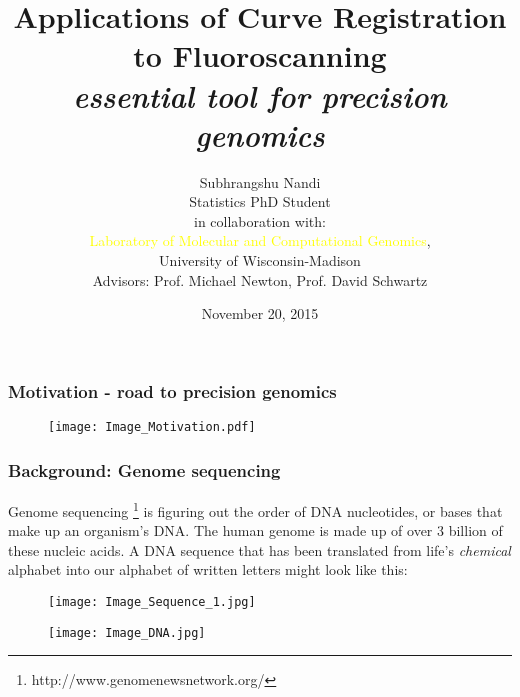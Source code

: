 \documentclass[10pt,dvipsnames,table, notes]{beamer}
\title[Curve Registration in Fluoroscanning]{Applications of Curve Registration to Fluoroscanning\\ {\emph{essential tool for precision genomics}}}
\author[S. Nandi]{Subhrangshu Nandi \\
Statistics PhD Student \\
\vspace{0.5cm}
\small{in collaboration with:} \\
\textcolor{yellow}{Laboratory of Molecular and Computational Genomics}, \\
University of Wisconsin-Madison \\
Advisors: Prof. Michael Newton, Prof. David Schwartz}
\date{November 20, 2015}
\begin{document}
\setlength{\baselineskip}{16truept}
\frame{\maketitle}




\begin{frame}
\frametitle{Motivation - road to precision genomics}
\begin{figure}[T]
\texttt{[image: Image\_Motivation.pdf]}
\end{figure}


\end{frame}

\begin{frame}
\frametitle{Background: Genome sequencing}
Genome sequencing \footnote{http://www.genomenewsnetwork.org/} is figuring out the order of DNA nucleotides, or bases that make up an organism's DNA. The human genome is made up of over 3 billion of these nucleic acids. A DNA sequence that has been translated from life's {\emph{chemical}} alphabet into our alphabet of written letters might look like this:
\begin{figure}[H]
\texttt{[image: Image\_Sequence\_1.jpg]}
\end{figure}
\pause
\begin{figure}[H]
\texttt{[image: Image\_DNA.jpg]}
\end{figure}

\note{}
\end{frame}
\end{document}
